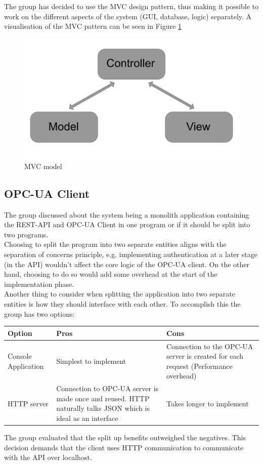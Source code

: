 The group has decided to use the MVC design pattern, thus making it possible to
work on the different aspects of the system (GUI, database, logic) separately. 
A visualisation of the MVC pattern can be seen in Figure \ref{figure:MVC_model}

\begin{figure}[H]
    \centering
    \includegraphics[scale=0.15]{images/MVC_model.png}
    \caption{MVC model}
    \label{figure:MVC_model}
\end{figure}

\subsection{OPC-UA Client}
The group discussed about the system being a monolith application containing 
the REST-API and OPC-UA Client in one program or if it should be split into two
programs.\\

Choosing to split the program into two separate entities aligns with the 
separation of concerns principle, e.g. implementing authentication at a later 
stage (in the API) wouldn't affect the core logic of the OPC-UA client. On the 
other hand, choosing to do so would add some overhead at the start of the 
implementation phase. \\

Another thing to consider when splitting the application into two separate 
entities is how they should interface with each other. To accomplish this the 
group has two options: 

\begin{table}[ht]
    \begin{tabularx}{\textwidth}{|>{\RaggedRight}X|>{\RaggedRight}X|>{\RaggedRight}X|}
        \hline
        \textbf{Option} & \textbf{Pros} & \textbf{Cons} \\
        \hline
        Console Application & Simplest to implement & Connection to the OPC-UA 
        server is created for each request (Performance overhead)\\
        \hline
        HTTP server & Connection to OPC-UA server is made once and reused. HTTP
        naturally talks JSON which is ideal as an interface & Takes longer to 
        implement \\
        \hline
    \end{tabularx}
    \label{someLabel}
\end{table}

The group evaluated that the split up benefits outweighed the negatives. This 
decision demands that the client uses HTTP communication to communicate with the
API over localhost. 
